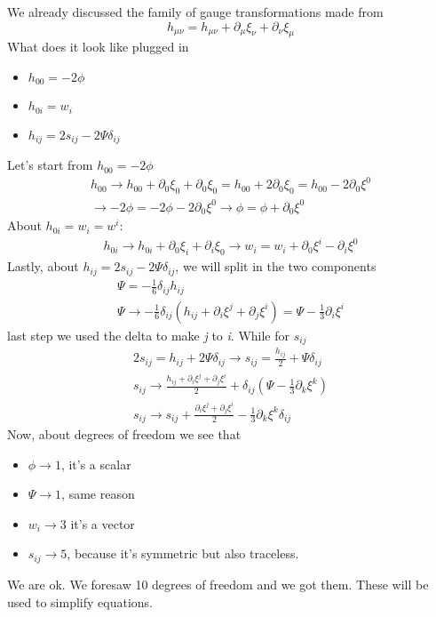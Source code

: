 We already discussed the family of gauge transformations made from
\[
h_{\mu \nu } = h_{\mu \nu } + \partial_{\mu }\xi _{\nu }+\partial_{\nu }\xi _{\mu }
\]
What does it look like plugged in
\begin{itemize}
\item $h_{00} = -2\phi $
\item $h_{0i} = w_{i}$
\item $h_{ij} = 2s_{ij} -2\Psi \delta _{ij}$ 
\end{itemize}
Let's start from $h_{00} = -2\phi $
\begin{gather*}
h_{00} \to  h_{00}+\partial_{0}\xi _{0}+\partial_{0}\xi_{0} = h_{00} +2\partial_{0}\xi _{0} = h_{00} -2\partial_{0}\xi ^{0}\\
\to -2\phi  = -2\phi - 2\partial_{0}\xi ^{0} \to  \phi = \phi +\partial_{0}\xi ^{0}
\end{gather*}
About $h_{0i} = w_{i} = w^{i}$:
\begin{gather*}
h_{0i} \to  h_{0i} + \partial_{0}\xi _{i} + \partial_{i}\xi _{0} \to w_{i} = w_{i} +\partial_{0}\xi^{i} -\partial_{i}\xi^{0}
\end{gather*}
Lastly, about $h_{ij} = 2s_{ij}-2\Psi \delta _{ij}$, we will split in the two components
\begin{gather*}
\Psi  = -\frac{1}{6}\delta _{ij}h_{ij} \\
\Psi \to -\frac{1}{6} \delta _{ij}\left( h_{ij}+\partial_{i}\xi ^{j}+\partial_{j}\xi ^{i} \right) = \Psi -\frac{1}{3}\partial_{i}\xi ^{i}
\end{gather*}
last step we used the delta to make \emph{j} to \emph{i}. While for $s_{ij}$
\begin{gather*}
	2s_{ij} = h_{ij} +2\Psi \delta _{ij}  \to  s_{ij} = \frac{h_{ij}}{2} + \Psi \delta _{ij}\\
	s_{ij} \to \frac{h_{ij} +\partial_{i}\xi ^{j}+\partial_{j}\xi ^{i}}{2} + \delta _{ij}\left( \Psi - \frac{1}{3}\partial_{k}\xi ^{k} \right) \\
	s_{ij} \to s_{ij} + \frac{\partial_{i}\xi ^{j}+\partial_{j}\xi ^{i}}{2} -\frac{1}{3}\partial_{k}\xi ^{k}\delta _{ij} 
\end{gather*}
Now, about degrees of freedom we see that
\begin{itemize}
\item $\phi  \to  1$, it's a scalar
\item $\Psi  \to  1$, same reason
\item $w_{i} \to  3$ it's a vector
\item $s_{ij}\to 5$, because it's symmetric but also traceless.	
\end{itemize}
We are ok. We foresaw 10 degrees of freedom and we got them. These will be used to simplify equations.

